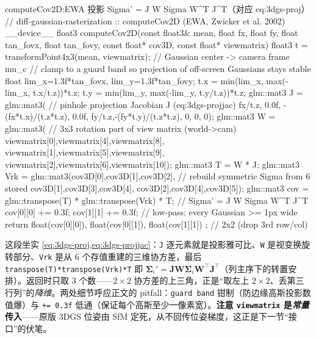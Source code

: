 \begin{codebox}[C++]{computeCov2D:EWA 投影 Sigma' = J W Sigma W\textasciicircum T J\textasciicircum T（对应 eq:3dgs-proj）}
// diff-gaussian-rasterization :: computeCov2D  (EWA, Zwicker et al. 2002)
__device__ float3 computeCov2D(const float3& mean, float fx, float fy,
        float tan_fovx, float tan_fovy, const float* cov3D, const float* viewmatrix) {
    float3 t = transformPoint4x3(mean, viewmatrix);    // Gaussian center -> camera frame  mu_c
    // clamp to a guard band so projection of off-screen Gaussians stays stable
    float lim_x=1.3f*tan_fovx, lim_y=1.3f*tan_fovy;
    t.x = min(lim_x, max(-lim_x, t.x/t.z))*t.z;  t.y = min(lim_y, max(-lim_y, t.y/t.z))*t.z;
    glm::mat3 J = glm::mat3(                            // pinhole projection Jacobian J (eq:3dgs-projjac)
        fx/t.z, 0.0f,  -(fx*t.x)/(t.z*t.z),
        0.0f,   fy/t.z,-(fy*t.y)/(t.z*t.z),
        0,      0,      0);
    glm::mat3 W = glm::mat3(                            // 3x3 rotation part of view matrix (world->cam)
        viewmatrix[0],viewmatrix[4],viewmatrix[8],
        viewmatrix[1],viewmatrix[5],viewmatrix[9],
        viewmatrix[2],viewmatrix[6],viewmatrix[10]);
    glm::mat3 T = W * J;
    glm::mat3 Vrk = glm::mat3(cov3D[0],cov3D[1],cov3D[2],   // rebuild symmetric Sigma from 6 stored
                              cov3D[1],cov3D[3],cov3D[4],
                              cov3D[2],cov3D[4],cov3D[5]);
    glm::mat3 cov = glm::transpose(T) * glm::transpose(Vrk) * T;  // Sigma' = J W Sigma W^T J^T
    cov[0][0] += 0.3f;  cov[1][1] += 0.3f;             // low-pass: every Gaussian >= 1px wide
    return { float(cov[0][0]), float(cov[0][1]), float(cov[1][1]) };  // 2x2 (drop 3rd row/col)
}
\end{codebox}

\noindent{}这段坐实 \cref{eq:3dgs-proj,eq:3dgs-projjac}：\texttt{J} 逐元素就是投影雅可比、\texttt{W} 是视变换旋转部分、\texttt{Vrk} 是从 $6$ 个存值重建的三维协方差，最后 \texttt{transpose(T)*transpose(Vrk)*T} 即 $\boldsymbol\Sigma_i'=\mathbf J\mathbf W\boldsymbol\Sigma_i\mathbf W^\top\mathbf J^\top$（列主序下的转置安排）。返回时只取 $3$ 个数——$2\times2$ 协方差的上三角，正是“取左上 $2\times2$、丢第三行列”的\emph{降维}。两处细节呼应正文的 pitfall：\texttt{guard band} 钳制（防边缘高斯投影数值爆）与 \texttt{+= 0.3f} 低通（保证每个高斯至少一像素宽）。\textbf{注意 \texttt{viewmatrix} 是\emph{常量}传入}——原版 3DGS 位姿由 SfM 定死，从不回传位姿梯度，这正是下一节“接口”的伏笔。

